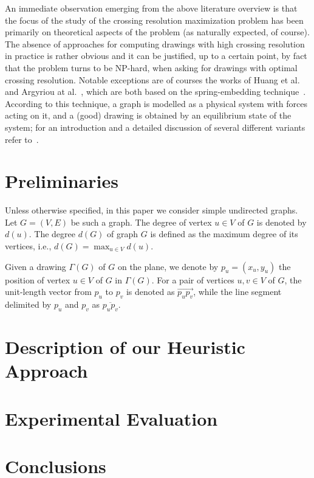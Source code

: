 \documentclass{llncs}
\begin{document}
An immediate observation emerging from the above literature overview is that the focus of the study of the crossing resolution maximization problem has been primarily on theoretical aspects of the problem (as naturally expected, of course). The absence of approaches for computing drawings with high crossing resolution in practice is rather obvious and it can be justified, up to a certain point, by fact that the problem turns to be NP-hard, when asking for drawings with optimal crossing resolution. Notable exceptions are of courses the works of Huang et al.~\cite{DBLP:journals/vlc/HuangEHL13} and Argyriou at al.~\cite{DBLP:journals/cj/ArgyriouBS13}, which are both based on the spring-embedding technique~\cite{DBLP:journals/congnum/Eades84}. According to this technique, a graph is modelled as a physical system with forces acting on it, and a (good) drawing is obtained by an equilibrium state of the system; for an introduction and a detailed discussion of several different variants refer to~\cite{DBLP:books/ph/BattistaETT99}. 

\section{Preliminaries}
\label{sec:preliminaries}

Unless otherwise specified, in this paper we consider simple undirected graphs. Let $G=(V,E)$ be such a graph. The degree of vertex $u\in V$ of $G$ is denoted by $d(u)$. The degree $d(G)$ of  graph $G$ is defined as the maximum degree of its vertices, i.e., $d(G)=\max_{u\in V}d(u)$.

Given a drawing $\Gamma(G)$ of $G$ on the plane, we denote by $p_u=(x_u,y_u)$ the position of vertex $u \in V$ of $G$ in $\Gamma(G)$. For a pair of vertices $u,v\in V$ of $G$, the unit-length vector from $p_u$ to $p_v$ is denoted as $\overrightarrow{p_up_v}$, while the line segment delimited by $p_u$ and $p_v$ as $\overline{p_up_v}$.


\section{Description of our Heuristic Approach}
\label{sec:algorithm}


\section{Experimental Evaluation}
\label{sec:experiments}


\section{Conclusions}
\label{sec:conclusions}



\end{document}
